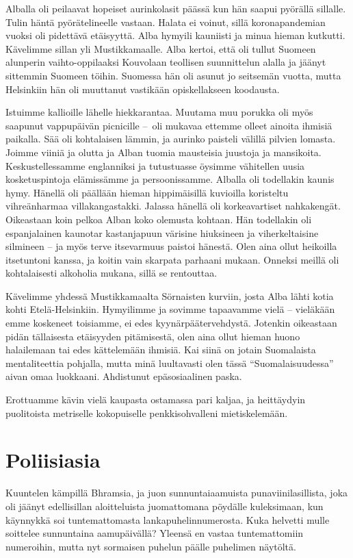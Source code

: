 \documentclass{tsnovel}
\begin{document}
Alballa oli peilaavat hopeiset aurinkolasit päässä kun hän saapui pyörällä sillalle. Tulin häntä pyörätelineelle vastaan. Halata ei voinut, sillä koronapandemian vuoksi oli pidettävä etäisyyttä. Alba hymyili kauniisti ja minua hieman kutkutti. Kävelimme sillan yli Mustikkamaalle. Alba kertoi, että oli tullut Suomeen alunperin vaihto-oppilaaksi Kouvolaan teollisen suunnittelun alalla ja jäänyt sittemmin Suomeen töihin. Suomessa hän oli asunut jo seitsemän vuotta, mutta Helsinkiin hän oli muuttanut vastikään opiskellakseen koodausta.

Istuimme kallioille lähelle hiekkarantaa. Muutama muu porukka oli myös saapunut vappupäivän picnicille – oli mukavaa ettemme olleet ainoita ihmisiä paikalla. Sää oli kohtalaisen lämmin, ja aurinko paisteli välillä pilvien lomasta. Joimme viiniä ja olutta ja Alban tuomia mausteisia juustoja ja mansikoita. Keskustellessamme englanniksi ja tutustuasse öysimme vähitellen uusia kosketuspintoja elämissämme ja persoonissamme. Alballa oli todellakin kaunis hymy. Hänellä oli päällään hieman hippimäisillä kuvioilla koristeltu vihreänharmaa villakangastakki. Jalassa hänellä oli korkeavartiset nahkakengät. Oikeastaan koin  pelkoa Alban koko olemusta kohtaan. Hän todellakin oli espanjalainen kaunotar kastanjapuun värisine hiuksineen ja viherkeltaisine silmineen – ja myös terve itsevarmuus paistoi hänestä. Olen aina ollut heikoilla itsetuntoni kanssa, ja koitin vain skarpata parhaani mukaan. Onneksi meillä oli kohtalaisesti alkoholia mukana, sillä se rentouttaa. 

Kävelimme yhdessä Mustikkamaalta Sörnaisten kurviin, josta Alba lähti kotia kohti Etelä-Helsinkiin. Hymyilimme ja sovimme tapaavamme vielä – vieläkään emme koskeneet toisiamme, ei edes kyynärpäätervehdystä. Jotenkin oikeastaan pidän tällaisesta etäisyyden pitämisestä, olen aina ollut hieman huono halailemaan tai edes kättelemään ihmisiä. Kai siinä on jotain Suomalaista mentaliteettia pohjalla, mutta minä luultavasti olen tässä ``Suomalaisuudessa'' aivan omaa luokkaani. Ahdistunut epäsosiaalinen paska.

Erottuamme kävin vielä kaupasta ostamassa pari kaljaa, ja heittäydyin puolitoista metriselle kokopuiselle penkkisohvalleni mietiskelemään.


\section{Poliisiasia}
Kuuntelen kämpillä Bhramsia, ja juon sunnuntaiaamuista punaviinilasillista, joka oli jäänyt edellisillan aloitteluista juomattomana pöydälle kuleksimaan, kun käynnykkä soi tuntemattomasta lankapuhelinnumerosta. Kuka helvetti mulle soittelee sunnuntaina aamupäivällä? Yleensä en vastaa tuntemattomiin numeroihin, mutta nyt sormaisen puhelun päälle puhelimen näytöltä.
\end{document}
